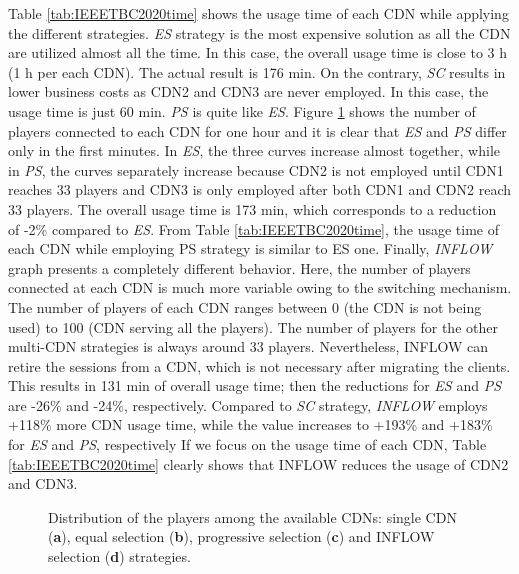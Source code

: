 Table \ref{tab:IEEETBC2020time} shows the usage time of each CDN while applying the different strategies. \textit{ES} strategy is the most expensive solution as all the CDN are utilized almost all the time. In this case, the overall usage time is close to 3 h (1 h per each CDN). The actual result is 176 min. On the contrary, \textit{SC} results in lower business costs as CDN2 and CDN3 are never employed. In this case, the usage time is just 60 min. \textit{PS} is quite like \textit{ES}. Figure \ref{fig:IEEETBC2020experiments2} shows the number of players connected to each CDN for one hour and it is clear that \textit{ES} and \textit{PS} differ only in the first minutes. In \textit{ES}, the three curves increase almost together, while in \textit{PS}, the curves separately increase because CDN2 is not employed until CDN1 reaches 33 players and CDN3 is only employed after both CDN1 and CDN2 reach 33 players. The overall usage time is 173 min, which corresponds to a reduction of -2\% compared to \textit{ES}. From Table \ref{tab:IEEETBC2020time}, the usage time of each CDN while employing PS strategy is similar to ES one. Finally, \textit{INFLOW} graph presents a completely different behavior. Here, the number of players connected at each CDN is much more variable owing to the switching mechanism. The number of players of each CDN ranges between 0 (the CDN is not being used) to 100 (CDN serving all the players). The number of players for the other multi-CDN strategies is always around 33 players. Nevertheless, INFLOW can retire the sessions from a CDN, which is not necessary after migrating the clients. This results in 131 min of overall usage time; then the reductions for \textit{ES} and \textit{PS} are -26\% and -24\%, respectively. Compared to \textit{SC} strategy, \textit{INFLOW} employs +118\% more CDN usage time, while the value increases to +193\% and +183\% for \textit{ES} and \textit{PS}, respectively If we focus on the usage time of each CDN, Table \ref{tab:IEEETBC2020time} clearly shows that INFLOW reduces the usage of CDN2 and CDN3.

\begin{figure}[htp]
	\centering
	\hfil
	\caption{Distribution of the players among the available CDNs: single CDN (\textbf{a}), equal selection (\textbf{b}), progressive selection (\textbf{c}) and INFLOW selection (\textbf{d}) strategies.}
	\label{fig:IEEETBC2020experiments2}
\end{figure}

